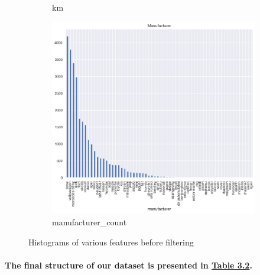 \begin{figure}[ht]
\begin{subfigure}[b]{0.48\linewidth}
        \caption{km}
        \label{fig:km}
    \end{subfigure}
    \hfill
    \begin{subfigure}[b]{0.48\linewidth}
        \centering
        \includegraphics[width=\linewidth]{images/priceprediction/outliers/manufacturer.png}
        \caption{manufacturer\_count}
        \label{fig:manufacturer_count}
    \end{subfigure}
    \caption{Histograms of various features before filtering}
    \label{fig:outliers}
\end{figure}


\paragraph{The final structure of our dataset is presented in \hyperref[tab:cleaned-table]{Table 3.2}.}

